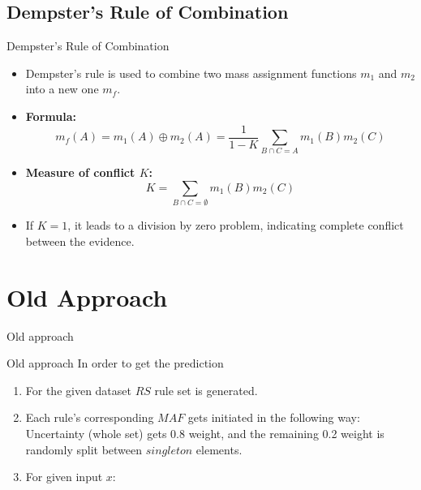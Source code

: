 \documentclass[aspectratio=169]{beamer}
\begin{document}
\subsection{Dempster's Rule of Combination}
\begin{frame}{Dempster's Rule of Combination}
\begin{itemize}
  \item Dempster's rule is used to combine two mass assignment functions \(m_1\) and \(m_2\) into a new one \(m_f\).
  \item \textbf{Formula:}
    \begin{equation*}
      m_f(A) = m_1(A) \oplus m_2(A) = \frac{1}{1 - K} \sum_{B \cap C = A} m_1(B) m_2(C)
    \end{equation*}
    \pause
  \item \textbf{Measure of conflict \(K\):}
    \begin{equation*}
      K = \sum_{B \cap C = \emptyset} m_1(B) m_2(C)
    \end{equation*}
    \pause
  \item If $K=1$, it leads to a division by zero problem, indicating complete conflict between the evidence.
  \end{itemize}
\end{frame}

\section{Old Approach}

\begin{frame}
    \begin{center}
        \Huge Old approach
    \end{center}
\end{frame}

\begin{frame}{Old approach}
    In order to get the prediction
\begin{enumerate}
    \item For the given dataset $RS$ rule set is generated.
    \item Each rule's corresponding $MAF$ gets initiated in the following way: Uncertainty (whole set) gets 0.8 weight, and the remaining 0.2 weight is randomly split between $singleton$ elements.
    \item For given input $x$:
\end{enumerate}
\end{frame}
\end{document}

